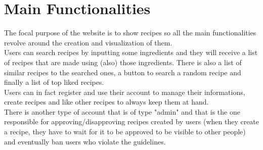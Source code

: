 \section{Main Functionalities}
The focal purpose of the website is to show recipes so all the main functionalities revolve around the creation and visualization of them.\\
Users can search recipes by inputting some ingredients and they will receive a list of recipes that are made using (also) those ingredients. There is also a list of similar recipes to the searched ones, a button to search a random recipe and finally a list of top liked recipes.\\
Users can in fact register and use their account to manage their informations, create recipes and like other recipes to always keep them at hand.\\
There is another type of account that is of type "admin" and that is the one responsible for approving/disapproving recipes created by users (when they create a recipe, they have to wait for it to be approved to be visible to other people) and eventually ban users who violate the guidelines.


